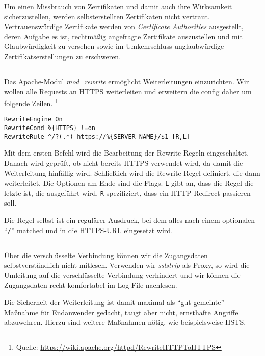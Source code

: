 \documentclass[10pt,a4paper]{article}
\begin{document}
        Um einen Missbrauch von Zertifikaten und damit auch ihre
        Wirksamkeit sicherzustellen, werden selbsterstellten Zertifikaten
        nicht vertraut. Vertrauenswürdige Zertifikate werden von
        \textit{Certificate Authorities} ausgestellt, deren Aufgabe es
        ist, rechtmäßig angefragte Zertifikate auszustellen und mit
        Glaubwürdigkeit zu versehen sowie im Umkehrschluss unglaubwürdige
        Zertifikatserstellungen zu erschweren.

\subsection{}
        Das Apache-Modul \textit{mod\_rewrite} ermöglicht Weiterleitungen einzurichten. Wir wollen alle Requests an HTTPS weiterleiten und erweitern die config daher um folgende Zeilen.
        \footnote{Quelle: \url{https://wiki.apache.org/httpd/RewriteHTTPToHTTPS}}

        \begin{verbatim}
RewriteEngine On
RewriteCond %{HTTPS} !=on
RewriteRule ^/?(.*) https://%{SERVER_NAME}/$1 [R,L]
        \end{verbatim}

        Mit dem ersten Befehl wird die Bearbeitung der Rewrite-Regeln eingeschaltet.
        Danach wird geprüft, ob nicht bereits HTTPS verwendet wird, da damit die
        Weiterleitung hinfällig wird. Schließlich wird die Rewrite-Regel definiert,
        die dann weiterleitet. Die Optionen am Ende sind die Flags. \texttt{L}
        gibt an, dass die Regel die letzte ist, die ausgeführt wird. \texttt{R}
        spezifiziert, dass ein HTTP Redirect passieren soll.

        Die Regel selbst ist ein regulärer Ausdruck, bei dem alles nach einem
        optionalen ``\texttt{/}'' matched und in die HTTPS-URL eingesetzt wird.

\subsection{}
        Über die verschlüsselte Verbindung können wir die Zugangsdaten
        selbstverständlich nicht mitlesen. Verwenden wir \textit{sslstrip} als
        Proxy, so wird die Umleitung auf die verschlüsselte Verbindung verhindert
        und wir können die Zugangsdaten recht komfortabel im Log-File nachlesen.

        Die Sicherheit der Weiterleitung ist damit maximal als ``gut gemeinte''
        Maßnahme für Endanwender gedacht, taugt aber nicht, ernsthafte Angriffe
        abzuwehren. Hierzu sind weitere Maßnahmen nötig, wie beispielsweise HSTS.
\end{document}
